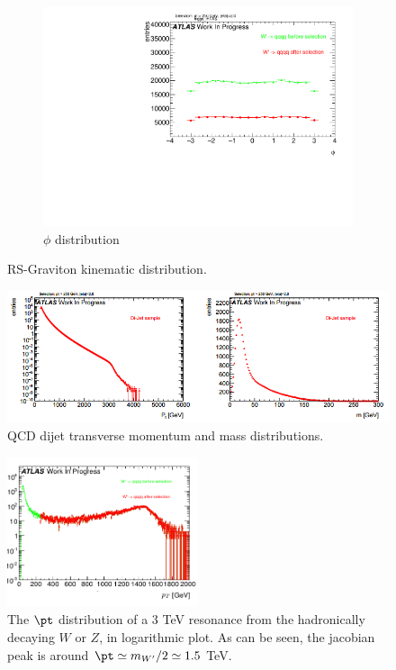 \begin{figure}
\begin{subfigure}[b]{0.45\textwidth}
        \includegraphics[width=\textwidth]{jet_part/appendixA/higgs/1cfrt_h_FatJet_psi.pdf}
        \caption{$\phi$ distribution}
        \label{fig:mouse}
    \end{subfigure}
    \caption{RS-Graviton kinematic distribution.}\label{fig:animals}
\end{figure}

\begin{figure}
    \centering
   \includegraphics[width=\textwidth]{jet_part/appendixA/qcd/qcdkinematics.png}
   
    \caption{QCD dijet transverse momentum and mass distributions.}
    \label{fig:qcdkinematics}
\end{figure}

\begin{figure}[!ht]
  \centering
      \includegraphics[width=0.5\textwidth]{jet_part/ptjcobian.png}
  \caption{The $\pt$ distribution of a 3 TeV resonance from the hadronically decaying $W$ or $Z$, in logarithmic plot. As can be seen, the jacobian peak is around $\pt\simeq m_{W'}/2\simeq 1.5$ TeV.}
  \label{fig:ptjacobian}
\end{figure}


